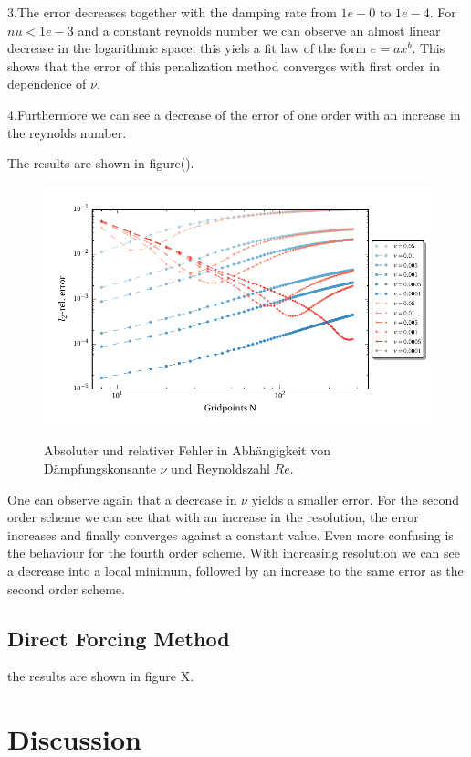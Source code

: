 3.The error decreases together with the damping rate from $1e-0$ to $1e-4$. For $nu<1e-3$ and a constant reynolds number we can observe an almost linear decrease in the logarithmic space,
this yiels a fit law of the form $ e = ax^b$. This shows that the error of this penalization method converges with first order in dependence of $\nu$.

4.Furthermore we can see a decrease of the error of one order with an increase in the reynolds number.

The results are shown in figure().

\begin{figure}[!t]
  \centering
  \includegraphics{gfx/immersed_boundary/poiseuille_flow/2_vp/vp_convergence.pdf}\label{fig:vp_conv}
  \caption{Absoluter und relativer Fehler in Abhängigkeit von Dämpfungskonsante $\nu$ und Reynoldszahl $Re$.}
\end{figure}
One can observe again that a decrease in $\nu$  yields a smaller error.
For the second order scheme we can see that with an increase in the resolution, the error increases and finally converges against a constant value.
Even more confusing is the behaviour for the fourth order scheme.
With increasing resolution we can see a decrease into a local minimum, followed by an increase to the same error as the second order scheme.


\subsection{Direct Forcing Method}
 the results are shown in figure X.

\clearpage


\section{Discussion}
